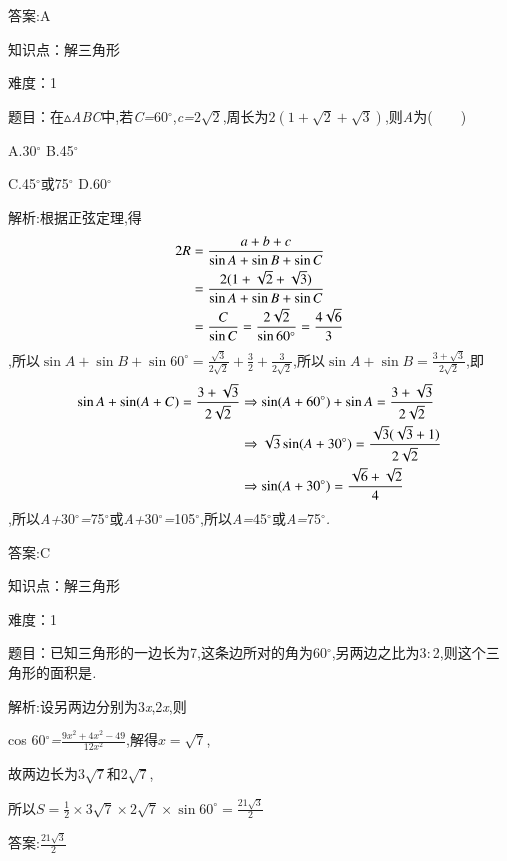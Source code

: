 \documentclass{article} %
\begin{document}
 答案:A

知识点：解三角形

难度：1

 题目：在$\mathrm{\vartriangle}$\textit{ABC}中,若\textit{C=}60$\mathrm{{}^\circ}$,\textit{c=}$2\sqrt{2}$,周长为$2(1+\sqrt{2}+\sqrt{3})$,则\textit{A}为(\textit{　　})

 A.30$\mathrm{{}^\circ}$ B.45$\mathrm{{}^\circ}$

 C.45$\mathrm{{}^\circ}$或75$\mathrm{{}^\circ}$ D.60$\mathrm{{}^\circ}$

 解析:根据正弦定理,得
\begin{align}
\notag
2R&=\frac{a+b+c}{\sin A+\sin B+\sin C}\\\notag
&=\frac{2(1+\sqrt{2}+\sqrt{3})}{\sin A+\sin B+\sin C}\\\notag
&=\frac{C}{\sin C}=\frac{2\sqrt{2}}{\sin 60^{\circ}}=\frac{4\sqrt{6}}{3}
\end{align}
,所以$\sin A+\sin B+\sin 60^{\circ}=\frac{\sqrt{3}}{2\sqrt{2}}+\frac{3}{2}+\frac{3}{2\sqrt{2}}$,所以$\sin A+\sin B=\frac{3+\sqrt{3}}{2\sqrt{2}}$,即
\begin{align}
\notag
\sin A+\sin (A+C)=\frac{3+\sqrt{3}}{2\sqrt{2}}
&\Rightarrow \sin (A+60^{\circ})+\sin A=\frac{3+\sqrt{3}}{2\sqrt{2}}\\\notag
&\Rightarrow\sqrt{3}\sin (A+30^{\circ})=\frac{\sqrt{3}(\sqrt{3}+1)}{2\sqrt{2}}\\\notag
&\Rightarrow\sin (A+30^{\circ})=\frac{\sqrt{6}+\sqrt{2}}{4}
\end{align}
,所以\textit{A+}30$\mathrm{{}^\circ}$\textit{=}75$\mathrm{{}^\circ}$或\textit{A+}30$\mathrm{{}^\circ}$\textit{=}105$\mathrm{{}^\circ}$,所以\textit{A=}45$\mathrm{{}^\circ}$或\textit{A=}75$\mathrm{{}^\circ}$\textit{.}

 答案:C

知识点：解三角形

难度：1

 题目：已知三角形的一边长为7,这条边所对的角为60$\mathrm{{}^\circ}$,另两边之比为3\textit{$:$}2,则这个三角形的面积是\textit{\underbar{　　　　　}.~}

 解析:设另两边分别为3\textit{x},2\textit{x},则

cos 60$\mathrm{{}^\circ}$\textit{=}$\frac{9x^2+4x^2-49}{12x^2}$,解得$x=\sqrt{7}$,

故两边长为$3\sqrt{7}$和$2\sqrt{7}$,

所以$S=\frac{1}{2}\times3\sqrt{7}\times2\sqrt{7}\times\sin 60^{\circ}=\frac{21\sqrt{3}}{2}$

 答案:$\frac{21\sqrt{3}}{2}$
\end{document}
